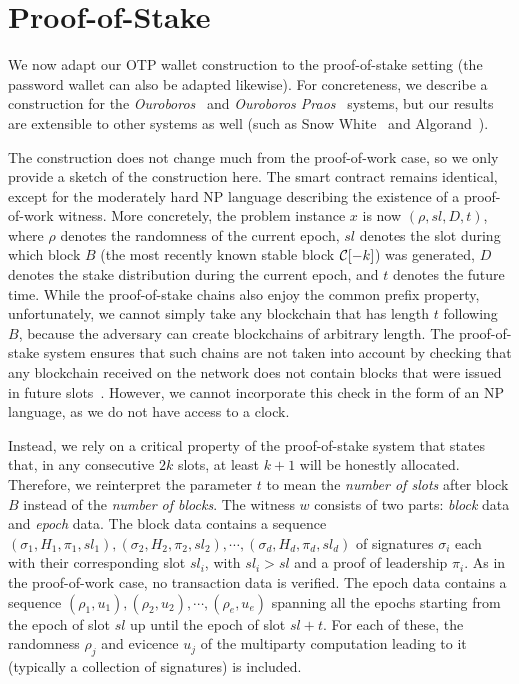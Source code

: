 \section{Proof-of-Stake}

We now adapt our OTP wallet construction to the proof-of-stake setting (the password wallet can also
be adapted likewise). For concreteness, we describe
a construction for the \emph{Ouroboros}~\cite{ouroboros} and \emph{Ouroboros Praos}~\cite{praos}
systems, but our results are extensible to other systems as well (such as Snow
White~\cite{DBLP:journals/iacr/BentovPS16a} and Algorand~\cite{algorand}).

The construction does not change much from the proof-of-work case, so we only provide a sketch
of the construction here. The smart contract remains identical, except
for the moderately hard \textsc{NP} language describing the existence of a proof-of-work witness.
More concretely, the problem instance $x$ is now $(\rho, sl, D, t)$, where $\rho$ denotes the randomness
of the current epoch, $sl$ denotes the
slot during which block $B$ (the most recently known stable block $\mathcal{C}[-k]$) was generated,
$D$ denotes the stake distribution during the current epoch, and $t$ denotes
the future time.
While the proof-of-stake chains also enjoy the common prefix property,
unfortunately, we cannot simply take any blockchain that has length $t$ following $B$,
because the adversary can create blockchains of arbitrary length. The proof-of-stake system
ensures that such chains are not taken into account by checking that any blockchain
received on the network does not contain blocks that were issued in future slots~\cite{ouroboros}.
However, we cannot incorporate this check in the form of an \textsc{NP} language, as
we do not have access to a clock.

Instead, we rely on a critical property of the proof-of-stake system that states that,
in any consecutive $2k$ slots, at least $k+1$ will be honestly allocated.
Therefore, we reinterpret the parameter $t$ to mean the \emph{number of slots} after
block $B$ instead of the \emph{number of blocks}. The witness $w$ consists
of two parts: \emph{block} data and \emph{epoch} data.
The block data contains a sequence
$(\sigma_1, H_1, \pi_1, sl_1),\allowbreak (\sigma_2, H_2, \pi_2, sl_2),\allowbreak
 \cdots,\allowbreak (\sigma_d, H_d, \pi_d, sl_d)$
of signatures
$\sigma_i$ each with their corresponding slot $sl_i$, with $sl_i > sl$ and
a proof of leadership $\pi_i$. As in the proof-of-work case, no transaction data is verified.
The epoch data contains a sequence
$(\rho_1, u_1),\allowbreak (\rho_2, u_2),\allowbreak \cdots,\allowbreak (\rho_e, u_e)$
spanning all the epochs starting from the epoch of slot $sl$ up until the epoch
of slot $sl + t$. For each of these, the randomness $\rho_j$ and evicence $u_j$ of the multiparty
computation leading to it (typically a collection of signatures) is included.

